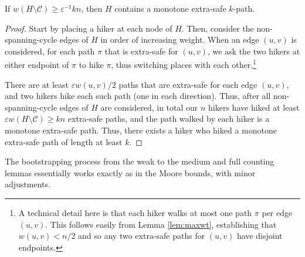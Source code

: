 \documentclass{theoretics}
\newcommand{\eps}{\varepsilon}
\newcommand{\cee}{\mathcal{C}}
\begin{document}
\begin{lemma}  \label{lem:warmupwc}
If $w(H \setminus \cee) \ge \eps^{-1} kn$, then $H$ contains a monotone extra-safe $k$-path.
\end{lemma}
\begin{proof}
Start by placing a hiker at each node of $H$.
Then, consider the non-spanning-cycle edges of $H$ in order of increasing weight.
When an edge $(u, v)$ is considered, for each path $\pi$ that is extra-safe for $(u, v)$, we ask the two hikers at either endpoint of $\pi$ to hike $\pi$, thus switching places with each other.\footnote{A technical detail here is that each hiker walks at most one path $\pi$ per edge $(u, v)$.  This follows easily from Lemma \ref{lem:maxwt}, establishing that $w(u, v) < n/2$ and so any two extra-safe paths for $(u, v)$ have disjoint endpoints.}


There are at least $\eps w(u, v)/2$ paths that are extra-safe for each edge $(u, v)$, and two hikers hike each such path (one in each direction).
Thus, after all non-spanning-cycle edges of $H$ are considered, in total our $n$ hikers have hiked at least $\eps w(H \setminus \cee) \ge kn$ extra-safe paths, and the path walked by each hiker is a monotone extra-safe path.
Thus, there exists a hiker who hiked a monotone extra-safe path of length at least $k$.
\end{proof}

The bootstrapping process from the weak to the medium and full counting lemmas essentially works exactly as in the Moore bounds, with minor adjustments.
\end{document}
